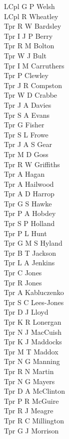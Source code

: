 \begin{multicols}{2}
  LCpl G P Welsh \\
  LCpl R Wheatley \\
  Tpr R W Bardsley \\
  Tpr I J P Berry \\
  Tpr R M Bolton \\
  Tpr W J Bult \\
  Tpr I M Carruthers \\
  Tpr P Clewley \\
  Tpr J R Compston \\
  Tpr W D Crabbe \\
  Tpr J A Davies \\
  Tpr S A Evans \\
  Tpr G Fisher \\
  Tpr S L Frowe \\
  Tpr J A S Gear \\
  Tpr M D Goss \\
  Tpr R W Griffiths \\
  Tpr A Hagan \\
  Tpr A Hailwood \\
  Tpr A D Harrop \\
  Tpr G S Hawke \\
  Tpr P A Hobdey \\
  Tpr S P Holland \\
  Tpr P L Hunt \\
  Tpr G M S Hyland \\
  Tpr B T Jackson \\
  Tpr L A Jenkins \\
  Tpr C Jones \\
  Tpr R Jones \\
  Tpr A Kabluczenko \\
  Tpr S C Lees-Jones \\
  Tpr D J Lloyd \\
  Tpr K R Lonergan \\
  Tpr N J MacCuish \\
  Tpr K J Maddocks \\
  Tpr M T Maddox \\
  Tpr N G Manning \\
  Tpr R N Martin \\
  Tpr N G Mayers \\
  Tpr D A McClinton \\
  Tpr P R McGuire \\
  Tpr R J Meagre \\
  Tpr R C Millington \\
  Tpr G J Morrison \\

\end{multicols}
